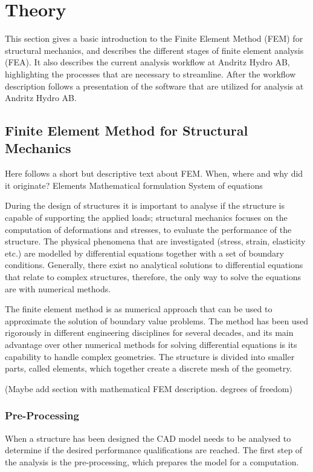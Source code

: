 
\section{Theory} %
\label{sec:theory}
This section gives a basic introduction to the Finite Element Method (FEM) for structural mechanics, and describes the different stages of finite element analysis (FEA). It also describes the current analysis workflow at Andritz Hydro AB, highlighting the processes that are necessary to streamline. After the workflow description follows a presentation of the software that are utilized for analysis at Andritz Hydro AB.

\subsection{Finite Element Method for Structural Mechanics} %
\label{sub:finite_element_method_in_structural_mechanics}
Here follows a short but descriptive text about FEM.
When, where and why did it originate?
Elements
Mathematical formulation
System of equations

During the design of structures it is important to analyse if the structure is capable of supporting the applied loads; structural mechanics focuses on the computation of deformations and stresses, to evaluate the performance of the structure. The physical phenomena that are investigated (stress, strain, elasticity etc.) are modelled by differential equations together with a set of boundary conditions. Generally, there exist no analytical solutions to differential equations that relate to complex structures, therefore, the only way to solve the equations are with numerical methods.

The finite element method is as numerical approach that can be used to approximate the solution of boundary value problems. The method has been used rigorously in different engineering disciplines for several decades, and its main advantage over other numerical methods for solving differential equations is its capability to handle complex geometries. The structure is divided into smaller parts, called elements, which together create a discrete mesh of the geometry.~\cite{ottossen92}

(Maybe add section with mathematical FEM description. degrees of freedom)


\subsubsection{Pre-Processing} %
\label{ssub:pre_processing}
When a structure has been designed the CAD model needs to be analysed to determine if the desired performance qualifications are reached. The first step of the analysis is the pre-processing, which prepares the model for a computation.

